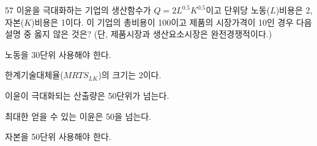 \begin{question}{57}
이윤을 극대화하는 기업의 생산함수가 $Q=2L^{ 0.5 } K^{ 0.5 }$이고 단위당 노동($L$)비용은 2, 자본($K$)비용은 1이다. 이 기업의 총비용이 100이고 제품의 시장가격이 10인 경우 다음 설명 중 옳지 않은 것은? (단, 제품시장과 생산요소시장은 완전경쟁적이다.)
\begin{choices}
  \item 노동을 30단위 사용해야 한다.
  \item 한계기술대체율($MRTS_{ LK }$)의 크기는 2이다.
  \item 이윤이 극대화되는 산출량은 50단위가 넘는다.
  \item 최대한 얻을 수 있는 이윤은 50을 넘는다.
  \item 자본을 50단위 사용해야 한다.
\end{choices}
\end{question}

